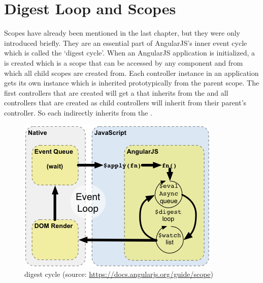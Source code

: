\section{Digest Loop and Scopes}

Scopes have already been mentioned in the last chapter, but they were only introduced briefly. They are an essential part of AngularJS's inner event cycle which is called the `digest cycle'. When an AngularJS application is initialized, a  is created which is a scope that can be accessed by any component and from which all child scopes are created from. Each controller instance in an application gets its own  instance which is inherited prototypically from the parent scope. The first controllers that are created will get a  that inherits from the  and all controllers that are created as child controllers will inherit from their parent's controller. So each  indirectly inherits from the .

\begin{figure}[htb]
  \centerline{
    \includegraphics[width=0.8\linewidth]{images/concepts-runtime.png}
  }
  \caption[digest cycle (source: \url{https://docs.angularjs.org/guide/scope})]{digest cycle (source: \url{https://docs.angularjs.org/guide/scope})}
  \label{fig:digest-loop}
\end{figure}

